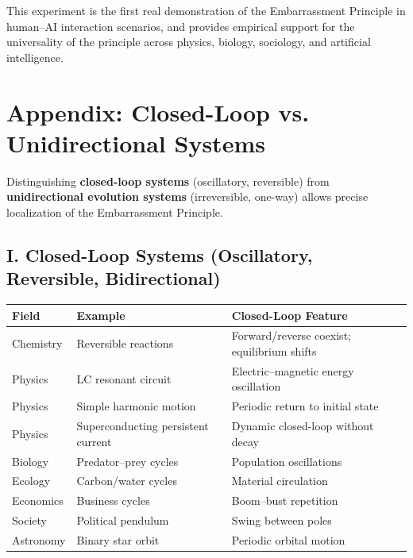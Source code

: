 \documentclass[10pt,a4paper]{article}
\begin{document}
This experiment is the first real demonstration of the Embarrassment Principle
in human–AI interaction scenarios, and provides empirical support
for the universality of the principle across physics, biology, sociology, and artificial intelligence.
\appendix
\section*{Appendix: Closed-Loop vs. Unidirectional Systems}

Distinguishing \textbf{closed-loop systems} (oscillatory, reversible)
from \textbf{unidirectional evolution systems} (irreversible, one-way)
allows precise localization of the Embarrassment Principle.

\subsection{I. Closed-Loop Systems (Oscillatory, Reversible, Bidirectional)}
\begin{center}
\small
\begin{tabular}{p{1.5cm}p{3.2cm}p{3.5cm}}
\toprule
Field & Example & Closed-Loop Feature \\
\midrule
Chemistry & Reversible reactions & Forward/reverse coexist; equilibrium shifts \\
Physics & LC resonant circuit & Electric–magnetic energy oscillation \\
Physics & Simple harmonic motion & Periodic return to initial state \\
Physics & Superconducting persistent current & Dynamic closed-loop without decay \\
Biology & Predator–prey cycles & Population oscillations \\
Ecology & Carbon/water cycles & Material circulation \\
Economics & Business cycles & Boom–bust repetition \\
Society & Political pendulum & Swing between poles \\
Astronomy & Binary star orbit & Periodic orbital motion \\
\bottomrule
\end{tabular}
\end{center}
\end{document}
